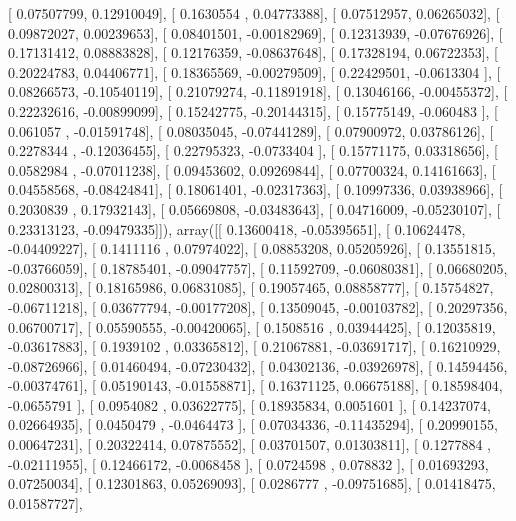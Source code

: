 \documentclass{article}
\begin{document}
       [ 0.07507799,  0.12910049],
       [ 0.1630554 ,  0.04773388],
       [ 0.07512957,  0.06265032],
       [ 0.09872027,  0.00239653],
       [ 0.08401501, -0.00182969],
       [ 0.12313939, -0.07676926],
       [ 0.17131412,  0.08883828],
       [ 0.12176359, -0.08637648],
       [ 0.17328194,  0.06722353],
       [ 0.20224783,  0.04406771],
       [ 0.18365569, -0.00279509],
       [ 0.22429501, -0.0613304 ],
       [ 0.08266573, -0.10540119],
       [ 0.21079274, -0.11891918],
       [ 0.13046166, -0.00455372],
       [ 0.22232616, -0.00899099],
       [ 0.15242775, -0.20144315],
       [ 0.15775149, -0.060483  ],
       [ 0.061057  , -0.01591748],
       [ 0.08035045, -0.07441289],
       [ 0.07900972,  0.03786126],
       [ 0.2278344 , -0.12036455],
       [ 0.22795323, -0.0733404 ],
       [ 0.15771175,  0.03318656],
       [ 0.0582984 , -0.07011238],
       [ 0.09453602,  0.09269844],
       [ 0.07700324,  0.14161663],
       [ 0.04558568, -0.08424841],
       [ 0.18061401, -0.02317363],
       [ 0.10997336,  0.03938966],
       [ 0.2030839 ,  0.17932143],
       [ 0.05669808, -0.03483643],
       [ 0.04716009, -0.05230107],
       [ 0.23313123, -0.09479335]]), array([[ 0.13600418, -0.05395651],
       [ 0.10624478, -0.04409227],
       [ 0.1411116 ,  0.07974022],
       [ 0.08853208,  0.05205926],
       [ 0.13551815, -0.03766059],
       [ 0.18785401, -0.09047757],
       [ 0.11592709, -0.06080381],
       [ 0.06680205,  0.02800313],
       [ 0.18165986,  0.06831085],
       [ 0.19057465,  0.08858777],
       [ 0.15754827, -0.06711218],
       [ 0.03677794, -0.00177208],
       [ 0.13509045, -0.00103782],
       [ 0.20297356,  0.06700717],
       [ 0.05590555, -0.00420065],
       [ 0.1508516 ,  0.03944425],
       [ 0.12035819, -0.03617883],
       [ 0.1939102 ,  0.03365812],
       [ 0.21067881, -0.03691717],
       [ 0.16210929, -0.08726966],
       [ 0.01460494, -0.07230432],
       [ 0.04302136, -0.03926978],
       [ 0.14594456, -0.00374761],
       [ 0.05190143, -0.01558871],
       [ 0.16371125,  0.06675188],
       [ 0.18598404, -0.0655791 ],
       [ 0.0954082 ,  0.03622775],
       [ 0.18935834,  0.0051601 ],
       [ 0.14237074,  0.02664935],
       [ 0.0450479 , -0.0464473 ],
       [ 0.07034336, -0.11435294],
       [ 0.20990155,  0.00647231],
       [ 0.20322414,  0.07875552],
       [ 0.03701507,  0.01303811],
       [ 0.1277884 , -0.02111955],
       [ 0.12466172, -0.0068458 ],
       [ 0.0724598 ,  0.078832  ],
       [ 0.01693293,  0.07250034],
       [ 0.12301863,  0.05269093],
       [ 0.0286777 , -0.09751685],
       [ 0.01418475,  0.01587727],
\end{document}
